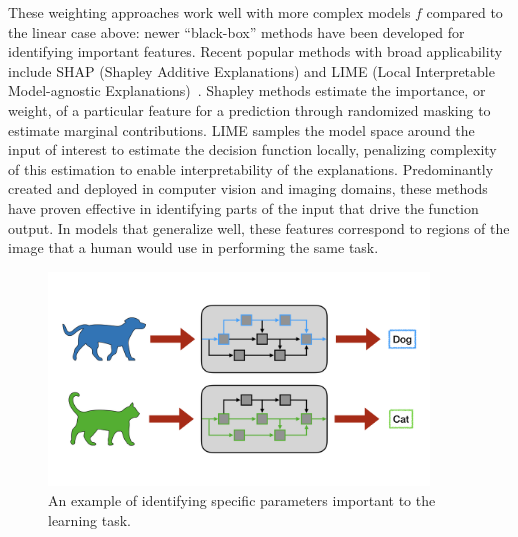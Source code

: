 These weighting approaches work well with more complex models $f$ compared to the linear case above: newer ``black-box'' methods have been developed for identifying important features.
Recent popular methods with broad applicability include SHAP (Shapley Additive Explanations) and LIME (Local Interpretable Model-agnostic Explanations)~\cite{shap,lime}.
Shapley methods estimate the importance, or weight, of a particular feature for a prediction through randomized masking to estimate marginal contributions.
LIME samples the model space around the input of interest to estimate the decision function locally, penalizing complexity of this estimation to enable interpretability of the explanations.
Predominantly created and deployed in computer vision and imaging domains, these methods have proven effective in identifying parts of the input that drive the function output.
In models that generalize well, these features correspond to regions of the image that a human would use in performing the same task.


\begin{figure}
    \centering
    \includegraphics[trim={0 3cm 0 3cm},clip,width=0.9\textwidth]{1_intro/figs/param_select.png}
    \caption[Visualization of parameter selection]{An example of identifying specific parameters important to the learning task.}
    \label{fig:param_select}
\end{figure}
